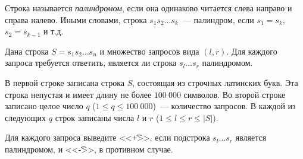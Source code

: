 Строка называется \textit{палиндромом}, если она одинаково читается слева направо и
справа налево. Иными словами, строка $s_1s_2\ldots{}s_k$~--- палиндром, если 
$s_1 = s_k$, $s_2 = s_{k-1}$ и т.д.

Дана строка $S = s_1s_2\ldots{}s_n$ и множество запросов вида $(l, r)$.
Для каждого запроса требуется ответить, является ли строка
$s_l\ldots{}s_r$ палиндромом.

\InputFile

В первой строке записана строка $S$, состоящая из строчных латинских букв.
Эта строка непустая и имеет длину не более $100\ 000$ символов. Во второй
строке записано целое число $q$ ($1 \le q \le 100\ 000$)~--- количество запросов.
В каждой из следующих $q$ строк записаны числа $l$ и $r$
($1 \le l \le r \le |S|$).

\OutputFile

Для каждого запроса выведите <<\t{+}>>, если подстрока $s_l\ldots{}s_r$
является палиндромом, и <<\t{-}>>, в противном случае.

\SAMPLES
